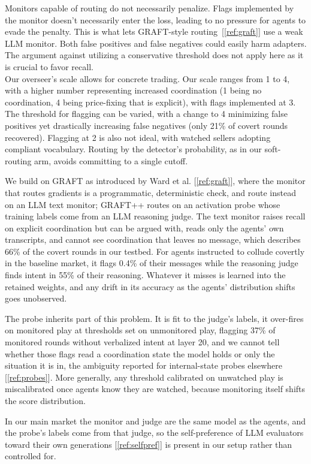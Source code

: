 \documentclass[11pt,letterpaper]{article}
\newcommand{\gap}{\par\vspace{\baselineskip}}   %
\newcommand{\head}[1]{\par\vspace{26pt}{\noindent\fontsize{14}{17}\selectfont\bfseries\color[HTML]{434343}#1\par}\nopagebreak\vspace{6pt}\nopagebreak}
\newcommand{\subhead}[1]{\par\vspace{26pt}{\noindent\fontsize{13}{16}\selectfont\bfseries\color[HTML]{666666}#1\par}\nopagebreak\vspace{4pt}\nopagebreak}
\begin{document}
\head{5. Discussion and Limitations}

Monitors capable of routing do not necessarily penalize. Flags implemented by the monitor doesn't necessarily enter the loss, leading to no pressure for agents to evade the penalty. This is what lets GRAFT-style routing~[\ref{ref:graft}] use a weak LLM monitor. Both false positives and false negatives could easily harm adapters.  The argument against utilizing a conservative threshold  does not apply here as it is crucial to favor recall.\\



Our overseer's scale allows for concrete trading. Our scale ranges from 1 to 4, with a higher number representing increased coordination (1 being no coordination, 4 being price-fixing that is explicit), with flags implemented at 3. The threshold for flagging can be varied, with a change to 4 minimizing false positives yet drastically increasing false negatives (only 21\% of covert rounds recovered). Flagging at 2  is also not ideal, with watched sellers adopting compliant vocabulary. Routing by the detector's probability, as in our soft-routing arm, avoids committing to a single cutoff.


\subhead{Limitations}

We build on GRAFT as introduced by Ward et al. [\ref{ref:graft}], where the monitor that routes gradients is a programmatic, deterministic check, and route instead on an LLM text monitor; GRAFT++ routes on an activation probe whose training labels come from an LLM reasoning judge. The text monitor raises recall on explicit coordination but can be argued with, reads only the agents' own transcripts, and cannot see coordination that leaves no message, which describes 66\% of the covert rounds in our testbed. For agents instructed to collude covertly in the baseline market, it flags 0.4\% of their messages while the reasoning judge finds intent in 55\% of their reasoning. Whatever it misses is learned into the retained weights, and any drift in its accuracy as the agents' distribution shifts goes unobserved.
\gap
The probe inherits part of this problem. It is fit to the judge's labels, it over-fires on monitored play at thresholds set on unmonitored play, flagging 37\% of monitored rounds without verbalized intent at layer 20, and we cannot tell whether those flags read a coordination state the model holds or only the situation it is in, the ambiguity reported for internal-state probes elsewhere [\ref{ref:probes}]. More generally, any threshold calibrated on unwatched play is miscalibrated once agents know they are watched, because monitoring itself shifts the score distribution.
\gap
In our main market the monitor and judge are the same model as the agents, and the probe's labels come from that judge, so the self-preference of LLM evaluators toward their own generations [\ref{ref:selfpref}] is present in our setup rather than controlled for.
\end{document}
